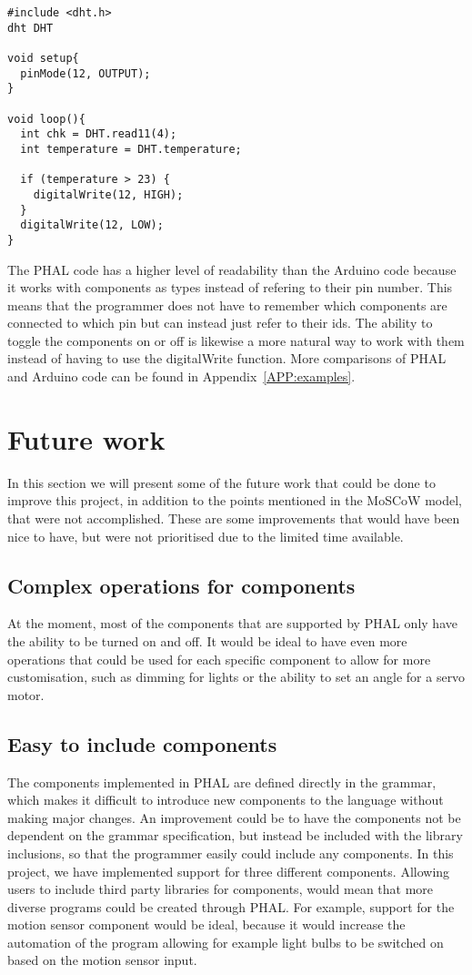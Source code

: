 \begin{lstlisting}[caption={Code example in Arduino}, label={code:codeArduino}]
#include <dht.h>
dht DHT

void setup{
  pinMode(12, OUTPUT);
}

void loop(){
  int chk = DHT.read11(4);
  int temperature = DHT.temperature;

  if (temperature > 23) {
    digitalWrite(12, HIGH);
  } 
  digitalWrite(12, LOW);
}
\end{lstlisting}
The PHAL code has a higher level of readability than the Arduino code because it works with components as types instead of refering to their pin number. This means that the programmer does not have to remember which components are connected to which pin but can instead just refer to their ids. The ability to toggle the components on or off is likewise a more natural way to work with them instead of having to use the digitalWrite function.
More comparisons of PHAL and Arduino code can be found in Appendix~\ref{APP:examples}.

\section{Future work}
In this section we will present some of the future work that could be done to improve this project, in addition to the points mentioned in the MoSCoW model, that were not accomplished. 
These are some improvements that would have been nice to have, but were not prioritised due to the limited time available.

\subsection*{Complex operations for components}
At the moment, most of the components that are supported by PHAL only have the ability to be turned on and off. 
It would be ideal to have even more operations that could be used for each specific component to allow for more customisation, such as dimming for lights or the ability to set an angle for a servo motor.

\subsection*{Easy to include components}
The components implemented in PHAL are defined directly in the grammar, which makes it difficult to introduce new components to the language without making major changes. 
An improvement could be to have the components not be dependent on the grammar specification, but instead be included with the library inclusions, so that the programmer easily could include any components.
In this project, we have implemented support for three different components. Allowing users to include third party libraries for components, would mean that more diverse programs could be created through PHAL. 
For example, support for the motion sensor component would be ideal, because it would increase the automation of the program allowing for example light bulbs to be switched on based on the motion sensor input.

